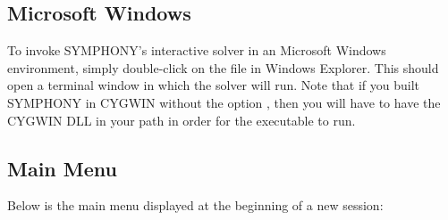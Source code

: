\subsection{Microsoft Windows}

To invoke SYMPHONY's interactive solver in an Microsoft Windows environment,
simply double-click on the  file in Windows Explorer. This
should open a terminal window in which the solver will run. Note that if you
built SYMPHONY in CYGWIN without the option , then
you will have to have the CYGWIN DLL in your path in order for the executable
to run.

\subsection{Main Menu}

Below is the main menu displayed at the beginning of a new session:


